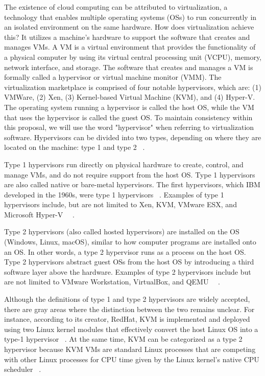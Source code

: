 \begin{doublespace}
The existence of cloud computing can be attributed to virtualization, a technology that enables multiple operating systems (OSs) to run concurrently in an isolated environment on the same hardware. How does virtualization achieve this? It utilizes a machine's hardware to support the software that creates and manages VMs. A VM is a virtual environment that provides the functionality of a physical computer by using its virtual central processing unit (VCPU), memory, network interface, and storage. The software that creates and manages a VM is formally called a hypervisor or virtual machine monitor (VMM). The virtualization marketplace is comprised of four notable hypervisors, which are: (1) VMWare, (2) Xen, (3) Kernel-based Virtual Machine (KVM), and (4) Hyper-V. The operating system running a hypervisor is called the host OS, while the VM that uses the hypervisor is called the guest OS. To maintain consistency within this proposal, we will use the word "hypervisor" when referring to virtualization software. Hypervisors can be divided into two types, depending on where they are located on the machine: type 1 and type 2 ~\cite{patel2025hypervisor}.

Type 1 hypervisors run directly on physical hardware to create, control, and manage VMs, and do not require support from the host OS. Type 1 hypervisors are also called native or bare-metal hypervisors. The first hypervisors, which IBM developed in the 1960s, were type 1 hypervisors ~\cite{meier2008ibm}. Examples of type 1 hypervisors include, but are not limited to Xen, KVM, VMware ESX, and Microsoft Hyper-V ~\cite{bauman2015survey}~\cite{patel2025hypervisor}.

Type 2 hypervisors (also called hosted hypervisors) are installed on the OS (Windows, Linux, macOS), similar to how computer programs are installed onto an OS. In other words, a type 2 hypervisor runs as a process on the host OS. Type 2 hypervisors abstract guest OSs from the host OS by introducing a third software layer above the hardware. Examples of type 2 hypervisors include but are not limited to VMware Workstation, VirtualBox, and QEMU ~\cite{bauman2015survey}~\cite{patel2025hypervisor}.

Although the definitions of type 1 and type 2 hypervisors are widely accepted, there are gray areas where the distinction between the two remains unclear. For instance, according to its creator, RedHat, KVM is implemented and deployed using two Linux kernel modules that effectively convert the host Linux OS into a type-1 hypervisor ~\cite{graziano2011performance}. At the same time, KVM can be categorized as a type 2 hypervisor because KVM VMs are standard Linux processes that are competing with other Linux processes for CPU time given by the Linux kernel's native CPU scheduler ~\cite{kvmcpuschedule}.


\end{doublespace}
